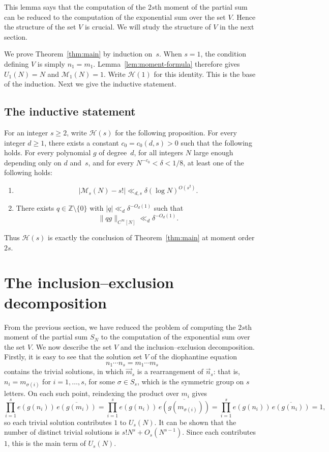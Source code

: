 This lemma says that the computation of the $2s$th moment of the partial sum 
can be reduced to the computation of 
the exponential sum over the set $V$. Hence the structure of the set $V$ is crucial. We will study the structure of $V$ in the next section.

We prove Theorem~\ref{thm:main} by induction on~$s$.
When $s=1$, the condition defining $V$ is simply $n_1=m_1$. Lemma~\ref{lem:moment-formula} therefore gives $U_1(N)=N$ and $\mathcal{M}_1(N)=1$. Write $\mathcal{H}(1)$ for this identity. This is the base of the induction.
Next we give the inductive statement.
\subsection{The inductive statement}
For an integer $s\geq 2$, write $\mathcal{H}(s)$ for the following proposition.
For every integer $d\geq 1$, there exists a constant $c_0=c_0(d,s)>0$ such that the following holds.
For every polynomial $g$ of degree~$d$, for all integers $N$ large enough depending only on $d$ and~$s$, and for every $N^{-c_0}<\delta<1/8$, at least one of the following holds:
\begin{enumerate}
    \item \[
    \bigl|\mathcal{M}_s(N)-s!\bigr|
    \ll_{d,s} \delta(\log N)^{O(s^2)}.
    \]
    \item There exists $q\in\mathbb{Z}\setminus\{0\}$ with $|q|\ll_d\delta^{-O_d(1)}$ such that
    \[
    \|qg\|_{C^{\infty}[N]}\ll_d\delta^{-O_d(1)}.
    \]
\end{enumerate}
Thus $\mathcal{H}(s)$ is exactly the conclusion of Theorem~\ref{thm:main} at moment order~$2s$.  
\section{The inclusion--exclusion decomposition}
\label{sec:inclusion-exclusion}

From the previous section, we have reduced the problem of computing the $2s$th moment of the partial sum $S_N$ to the computation of the exponential sum over the set $V$.
We now describe the set $V$ and the inclusion--exclusion decomposition.
Firstly, it is easy to see that the solution set $V$ of the diophantine equation
\[
n_1\cdots n_s=m_1\cdots m_s
\]
contains the trivial solutions, in which \(\vec{m}_s\) is a rearrangement of \(\vec{n}_s\):
that is, \(n_i=m_{\sigma(i)}\) for \(i=1,\dots,s\), for some \(\sigma\in S_s\), which is the symmetric group on \(s\) letters.
On each such point, reindexing the product over \(m_i\) gives
\[
\prod_{i=1}^s e(g(n_i))\,\overline{e(g(m_i))}
=\prod_{i=1}^s e(g(n_i))\,\overline{e(g(m_{\sigma(i)}))}
=\prod_{i=1}^s e(g(n_i))\,\overline{e(g(n_i))}
=1,
\]
so each trivial solution contributes \(1\) to \(U_s(N)\).
It can be shown that the number of distinct trivial solutions is \(s!N^s+O_s(N^{s-1})\).
Since each contributes \(1\), this is the main term of \(U_s(N)\).




